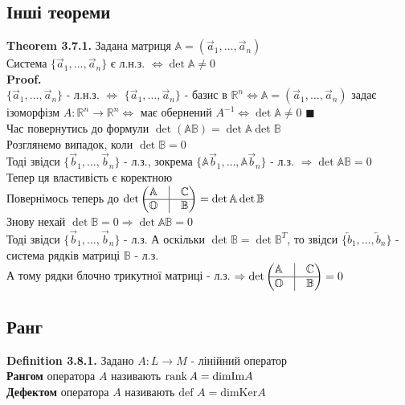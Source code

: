 \documentclass[a4paper, 14pt]{extarticle}
\def\defin#1{\textbf{Definition {#1}}}
\def\th#1{\textbf{Theorem {#1}}}
\def\proof{\textbf{Proof.}\\}
\def\bigline{\vspace{5mm}\\}
\def\qed{$\blacksquare$}
\def\dim#1{\textrm{dim} {#1}}
\def\ker#1{\textrm{Ker} {#1}}
\begin{document}
\subsection{Інші теореми}
\th{3.7.1.} Задана матриця $\mathbb{A} = (\vec{a}_1,\dots,\vec{a}_n)$\\
Система $\{\vec{a}_1, \dots, \vec{a}_n\}$ є л.н.з. $\iff \det \mathbb{A} \neq 0$\\
\proof
$\{\vec{a}_1,\dots,\vec{a}_n\}$ - л.н.з. $\iff$ $\{\vec{a}_1,\dots,\vec{a}_n\}$ - базис в $\mathbb{R}^n \iff \mathbb{A} = (\vec{a}_1,\dots,\vec{a}_n)$ задає ізоморфізм $A: \mathbb{R}^n \to \mathbb{R}^n \iff$ має обернений $A^{-1} \iff \det \mathbb{A} \neq 0$ \qed
\bigline
Час повернутись до формули $\det (\mathbb{A} \mathbb{B}) = \det \mathbb{A} \det \mathbb{B}$\\
Розглянемо випадок, коли $\det \mathbb{B} = 0$\\
Тоді звідси $\{\vec{b}_1, \dots, \vec{b}_n\}$ - л.з., зокрема $\{\mathbb{A}\vec{b}_1, \dots, \mathbb{A} \vec{b}_n\}$ - л.з. $\Rightarrow \det \mathbb{A} \mathbb{B} = 0$\\
Тепер ця властивість є коректною
\bigline
Повернімось теперь до $\det \begin{pmatrix}
 \mathbb{A} & \vline & \mathbb{C} \\
 \hline
 \mathbb{O} & \vline & \mathbb{B}
\end{pmatrix} = \det \mathbb{A} \det \mathbb{B}$\\
Знову нехай $\det \mathbb{B} = 0 \Rightarrow \det \mathbb{A} \mathbb{B} = 0$\\
Тоді звідси $\{ \vec{b}_1,\dots,\vec{b}_n \}$ - л.з. А оскільки $\det \mathbb{B} = \det \mathbb{B}^T$, то звідси $\{ \overleftarrow{b}_1,\dots,\overleftarrow{b}_n \}$ - система рядків матриці $\mathbb{B}$ - л.з.\\
А тому рядки блочно трикутної матриці - л.з. $\Rightarrow \det \begin{pmatrix}
 \mathbb{A} & \vline & \mathbb{C} \\
 \hline
 \mathbb{O} & \vline & \mathbb{B}
\end{pmatrix} = 0$

\subsection{Ранг}
\defin{3.8.1.} Задано $A: L \to M$ - лінійний оператор\\
\textbf{Рангом} оператора $A$ називають $\rank A = \dim \Im A$\\
\textbf{Дефектом} оператора $A$ називають $\textrm{def } A = \dim{\ker A}$
\bigline
\end{document}
